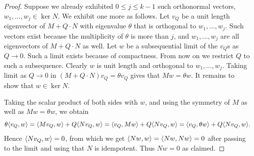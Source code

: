 \documentclass[11pt]{article}
\theoremstyle{definition}
\numberwithin{equation}{section}
\newcommand\+{\mkern2mu}
\newcommand{\1}{\mathbf 1}
\DeclarePairedDelimiter{\sprod}{\langle}{\rangle}
\begin{document}
\begin{proof}
Suppose we already exhibited $0 \leq j \leq k-1$ such orthonormal vectors, $w_1, \dots, w_j \in \ker N$. We exhibit one more as follows. Let $v_Q$ be a unit length eigenvector of $M+Q \cdot N$ with eigenvalue $\theta$ that is orthogonal to $w_1, \dots, w_j$. Such vectors exist because the multiplicity of $\theta$ is more than $j$, and $w_1, \dots, w_j$ are all eigenvectors of $M+ Q \cdot N$ as well. Let $w$ be a subsequential limit of the $v_Q$s as $Q \to 0$. Such a limit exists because of compactness. From now on we restrict $Q$ to such a subsequence. Clearly $w$ is unit length and orthogonal to $w_1, \dots, w_j$. Taking limit as $Q \to 0$ in $(M+Q \cdot N)v_Q = \theta v_Q$ gives that $M w= \theta w$.  It remains to show that $w \in \ker N$.

Taking the scalar product of both sides with $w$, and using the symmetry of $M$ as well as $M w = \theta w$, we obtain
\[ \theta \sprod{v_Q, w}=  \sprod{M v_Q, w} + Q \sprod{N v_Q, w} = \sprod{v_Q, M w} + Q \sprod{N v_Q, w} = \sprod{v_Q, \theta w} + Q \sprod{N v_Q, w} . \]
Hence $\sprod{N v_Q, w} =0$, from which we get $\sprod{N w,w}=\sprod{Nw, Nw} = 0$ after passing to the limit and using that $N$ is idempotent. Thus $N w =0$ as claimed.
\end{proof}
\end{document}
